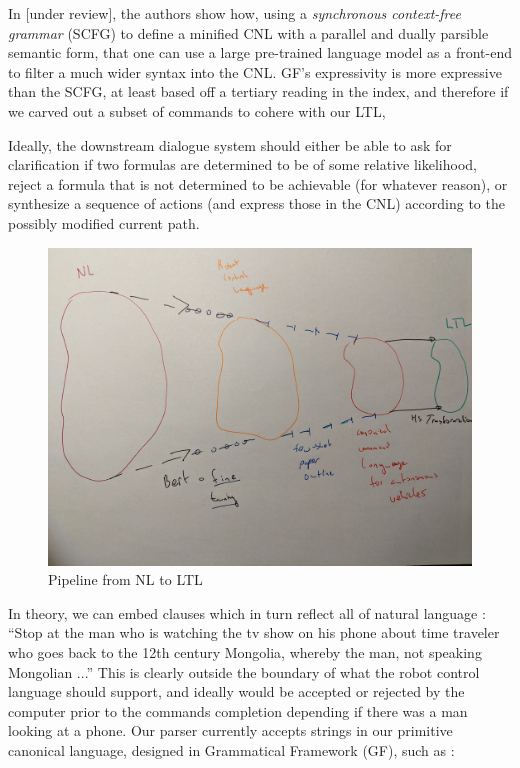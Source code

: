 \documentclass{article}
\begin{document}
In \cite{fewShotSem} [under review], the authors show how, using a \emph{synchronous
context-free grammar} (SCFG) to define a minified CNL with a parallel and dually
parsible semantic form, that one can use a large pre-trained language model as a front-end
to filter a much wider syntax into the CNL. GF's expressivity is
more expressive than the SCFG, at least based off a tertiary reading in the
index, and therefore if we carved out a subset of commands to cohere with our
LTL,

Ideally, the downstream dialogue system should either be able to ask for
clarification if two formulas are determined to be of some relative likelihood,
reject a formula that is not determined to be achievable (for whatever reason),
or synthesize a sequence of actions (and express those in the CNL) according to
the possibly modified current path.

\begin{figure}
\centering
\includegraphics[width=150mm]{pics/three.jpg}
\caption{Pipeline from NL to LTL}\label{fig:M3}
\end{figure}

In theory, we can embed clauses which in turn reflect all of natural language :
``Stop at the man who is watching the tv show on his phone about time traveler
who goes back to the 12th century Mongolia, whereby the man, not speaking
Mongolian ...'' This is clearly outside the boundary of what the robot control
language should support, and ideally would be accepted or rejected by the
computer prior to the commands completion depending if there was a man looking
at a phone. Our parser currently accepts strings in our primitive canonical
language, designed in Grammatical Framework (GF), such as :
\end{document}
